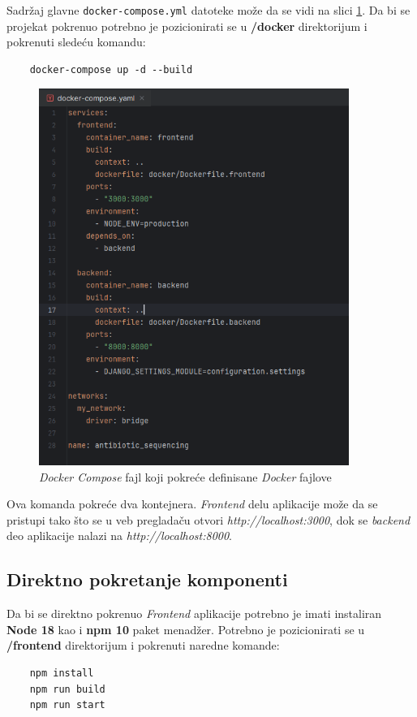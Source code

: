 \documentclass[12pt,oneside]{memoir}
\begin{document}
Sadržaj glavne \texttt{docker-compose.yml} datoteke može da se vidi na slici \ref{fig:docker_compose}. Da bi se projekat pokrenuo potrebno je pozicionirati se u \textbf{/docker} direktorijum i pokrenuti sledeću komandu:
\begin{verbatim}
    docker-compose up -d --build
\end{verbatim}

\begin{figure}[h]
\centering
\includegraphics[width=0.9\textwidth]{images/docker_compose.png}
\caption{\emph{Docker Compose} fajl koji pokreće definisane \emph{Docker} fajlove}
\label{fig:docker_compose}
\end{figure}


Ova komanda pokreće dva kontejnera. \emph{Frontend} delu aplikacije može da se pristupi tako što se u veb pregladaču otvori \emph{http://localhost:3000}, dok se \emph{backend} deo aplikacije nalazi na \emph{http://localhost:8000}.

\subsection{Direktno pokretanje komponenti}

Da bi se direktno pokrenuo \emph{Frontend} aplikacije potrebno je imati instaliran \textbf{Node 18} kao i \textbf{npm 10} paket menadžer. Potrebno je pozicionirati se u \textbf{/frontend} direktorijum i pokrenuti naredne komande:
\begin{verbatim}
    npm install
    npm run build
    npm run start
\end{verbatim}
\end{document}
